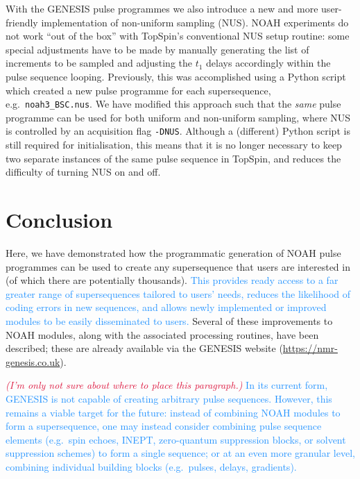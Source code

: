 \documentclass[a4paper,11pt]{article}
\newcommand{\todo}[1]{\textcolor{Crimson}{#1}}
\newcommand{\changed}[1]{\textcolor{DodgerBlue}{#1}}
\newcommand{\theurl}{\url{https://nmr-genesis.co.uk}}
\begin{document}
\begin{refsection}
With the GENESIS pulse programmes we also introduce a new and more user-friendly implementation of non-uniform sampling (NUS).
NOAH experiments do not work ``out of the box'' with TopSpin's conventional NUS setup routine: some special adjustments have to be made by manually generating the list of increments to be sampled and adjusting the \(t_1\) delays accordingly within the pulse sequence looping.
Previously, this was accomplished using a Python script which created a new pulse programme for each supersequence, e.g.\ \texttt{noah3\_BSC.nus}.\autocite{Claridge2019MRC}
We have modified this approach such that the \textit{same} pulse programme can be used for both uniform and non-uniform sampling, where NUS is controlled by an acquisition flag \texttt{-DNUS}.
Although a (different) Python script is still required for initialisation, this means that it is no longer necessary to keep two separate instances of the same pulse sequence in TopSpin, and reduces the difficulty of turning NUS on and off.


\section{Conclusion}

Here, we have demonstrated how the programmatic generation of NOAH pulse programmes can be used to create any supersequence that users are interested in (of which there are potentially thousands).
\changed{This provides ready access to a far greater range of supersequences tailored to users' needs, reduces the likelihood of coding errors in new sequences, and allows newly implemented or improved modules to be easily disseminated to users.}
Several of these improvements to NOAH modules, along with the associated processing routines, have been described; these are already available via the GENESIS website (\theurl{}).

\todo{\textit{(I'm only not sure about where to place this paragraph.)}}
\changed{
    In its current form, GENESIS is not capable of creating arbitrary pulse sequences.
    However, this remains a viable target for the future: instead of combining NOAH modules to form a supersequence, one may instead consider combining pulse sequence elements (e.g.\ spin echoes, INEPT, zero-quantum suppression blocks, or solvent suppression schemes) to form a single sequence; or at an even more granular level, combining individual building blocks (e.g.\ pulses, delays, gradients).
}

\printbibliography{}
\end{refsection}
\end{document}
